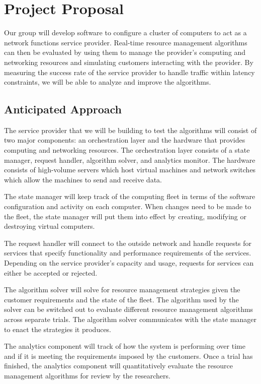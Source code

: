 \documentclass{sig-alternate}
\begin{document}
\section{Project Proposal}
\label{sec:project_proposal}
Our group will develop software to configure a cluster of computers to act as a network functions service provider. Real-time resource management algorithms can then be evaluated by using them to manage the provider's computing and networking resources and simulating customers interacting with the provider. By measuring the success rate of the service provider to handle traffic within latency constraints, we will be able to analyze and improve the algorithms.

\subsection{Anticipated Approach}
\label{subsec:approach}

The service provider that we will be building to test the algorithms will consist of two major components: an orchestration layer and the hardware that provides computing and networking resources. The orchestration layer consists of a state manager, request handler, algorithm solver, and analytics monitor. The hardware consists of high-volume servers which host virtual machines and network switches which allow the machines to send and receive data.

The state manager will keep track of the computing fleet in terms of the software configuration and activity on each computer. When changes need to be made to the fleet, the state manager will put them into effect by creating, modifying or destroying virtual computers.

The request handler will connect to the outside network and handle requests for services that specify functionality and performance requirements of the services. Depending on the service provider's capacity and usage, requests for services can either be accepted or rejected.

The algorithm solver will solve for resource management strategies given the customer requirements and the state of the fleet. The algorithm used by the solver can be switched out to evaluate different resource management algorithms across separate trials. The algorithm solver communicates with the state manager to enact the strategies it produces.

The analytics component will track of how the system is performing over time and if it is meeting the requirements imposed by the customers. Once a trial has finished, the analytics component will quantitatively evaluate the resource management algorithms for review by the researchers.
\end{document}
